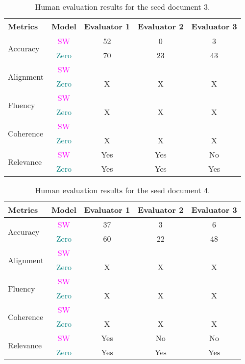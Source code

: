 \begin{table*}[h!]
\small 
\centering
\begin{tabular}{@{}p{2cm}c|c|c|c@{}}
\toprule
\textbf{Metrics} & \textbf{Model} & \textbf{Evaluator 1} & \textbf{Evaluator 2} & \textbf{Evaluator 3} \\ \midrule
 \multirow{2}{*}{Accuracy} &   \textcolor{magenta}{SW} & 52 & 0 & 3\\
\cmidrule(r){2-5}
& {\textcolor{teal}{Zero}} & 70 & 23 & 43\\
\midrule
\multirow{2}{*}{Alignment} &   \textcolor{magenta}{SW} &  &  \\
\cmidrule(r){2-5}
& {\textcolor{teal}{Zero}} & X & X & X\\
\midrule
\multirow{2}{*}{Fluency} &   \textcolor{magenta}{SW} &  &  &\\
\cmidrule(r){2-5}
& {\textcolor{teal}{Zero}} & X & X & X\\
\midrule
\multirow{2}{*}{Coherence} &   \textcolor{magenta}{SW} &  &  &\\
\cmidrule(r){2-5}
& {\textcolor{teal}{Zero}} & X & X & X\\
\midrule
\multirow{2}{*}{Relevance} &   \textcolor{magenta}{SW} & Yes & Yes & No\\
\cmidrule(r){2-5}
& {\textcolor{teal}{Zero}} & Yes & Yes & Yes\\
\bottomrule
\end{tabular}
\caption{Human evaluation results for the seed document 3.}
\label{table:human-eval-seed3}
\end{table*}

\begin{table*}[h!]
\small 
\centering
\begin{tabular}{@{}p{2cm}c|c|c|c@{}}
\toprule
\textbf{Metrics} & \textbf{Model} & \textbf{Evaluator 1} & \textbf{Evaluator 2} & \textbf{Evaluator 3} \\ \midrule
 \multirow{2}{*}{Accuracy} &  \textcolor{magenta}{SW} & 37 & 3 & 6\\
\cmidrule(r){2-5}
& {\textcolor{teal}{Zero}} & 60 & 22 & 48\\
\midrule
\multirow{2}{*}{Alignment} &  \textcolor{magenta}{SW} &  &  \\
\cmidrule(r){2-5}
& {\textcolor{teal}{Zero}} & X & X & X\\
\midrule
\multirow{2}{*}{Fluency} &  \textcolor{magenta}{SW} &  &  &\\
\cmidrule(r){2-5}
& {\textcolor{teal}{Zero}} & X & X & X\\
\midrule
\multirow{2}{*}{Coherence} &  \textcolor{magenta}{SW} &  &  &\\
\cmidrule(r){2-5}
& {\textcolor{teal}{Zero}} & X & X & X\\
\midrule
\multirow{2}{*}{Relevance} &  \textcolor{magenta}{SW} & Yes & No & No\\
\cmidrule(r){2-5}
& {\textcolor{teal}{Zero}} & Yes & Yes & Yes\\
\bottomrule
\end{tabular}
\caption{Human evaluation results for the seed document 4.}
\label{table:human-eval-seed4}
\end{table*}


